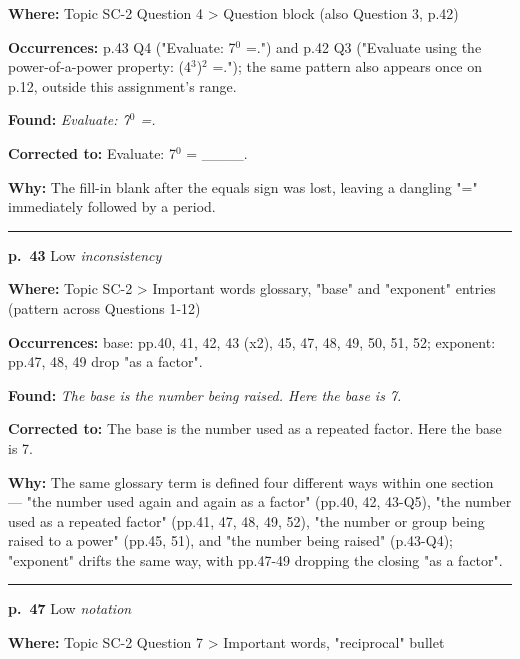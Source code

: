 \documentclass[11pt]{article}
\newcommand{\sevlow}[1]{\textcolor{black!55}{#1}}
\begin{document}
\noindent\textbf{Where: }Topic SC-2 Question 4 > Question block (also Question 3, p.42)\par
\noindent\textbf{Occurrences: }p.43 Q4 ("Evaluate: 7$^0$ =.") and p.42 Q3 ("Evaluate using the power-of-a-power property: (4$^3$)$^2$ =."); the same pattern also appears once on p.12, outside this assignment's range.\par
\noindent\textbf{Found: }\textit{Evaluate: 7$^0$ =.}\par
\noindent\textbf{Corrected to: }Evaluate: 7$^0$ = \_\_\_\_.\par
\noindent\textbf{Why: }The fill-in blank after the equals sign was lost, leaving a dangling "=" immediately followed by a period.\par\vspace{4pt}
\noindent\rule{\textwidth}{0.4pt}\par\nobreak\vspace{2pt}
\noindent\textbf{p.~43} \quad \sevlow{Low} \quad \textit{inconsistency}\par
\noindent\textbf{Where: }Topic SC-2 > Important words glossary, "base" and "exponent" entries (pattern across Questions 1-12)\par
\noindent\textbf{Occurrences: }base: pp.40, 41, 42, 43 (x2), 45, 47, 48, 49, 50, 51, 52; exponent: pp.47, 48, 49 drop "as a factor".\par
\noindent\textbf{Found: }\textit{The base is the number being raised. Here the base is 7.}\par
\noindent\textbf{Corrected to: }The base is the number used as a repeated factor. Here the base is 7.\par
\noindent\textbf{Why: }The same glossary term is defined four different ways within one section --- "the number used again and again as a factor" (pp.40, 42, 43-Q5), "the number used as a repeated factor" (pp.41, 47, 48, 49, 52), "the number or group being raised to a power" (pp.45, 51), and "the number being raised" (p.43-Q4); "exponent" drifts the same way, with pp.47-49 dropping the closing "as a factor".\par\vspace{4pt}
\noindent\rule{\textwidth}{0.4pt}\par\nobreak\vspace{2pt}
\noindent\textbf{p.~47} \quad \sevlow{Low} \quad \textit{notation}\par
\noindent\textbf{Where: }Topic SC-2 Question 7 > Important words, "reciprocal" bullet\par
\end{document}
